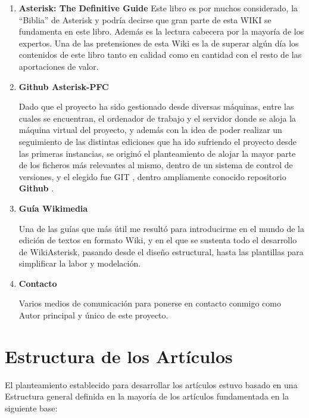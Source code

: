 \begin{enumerate}
	  \setlength{\itemsep}{10pt}

	\item \textbf{Asterisk: The Definitive Guide}
	Este libro es por muchos considerado, la ``Biblia'' de Asterisk y podría decirse que gran parte de esta WIKI se fundamenta en este libro. Además es la lectura cabecera por la mayoría de los expertos. Una de las pretensiones de esta Wiki es la de superar algún día los contenidos de este libro tanto en calidad como en cantidad con el resto de las aportaciones de valor.
	
	\item \textbf{Github Asterisk-PFC}
	
	Dado que el proyecto ha sido gestionado desde diversas máquinas, entre las cuales se encuentran, el ordenador de trabajo y el servidor donde se aloja la máquina virtual del proyecto, y además con la idea de poder realizar un seguimiento de las distintas ediciones que ha ido sufriendo el proyecto desde las primeras instancias, se originó el planteamiento de alojar la mayor parte de los ficheros más relevantes al mismo, dentro de un sistema de control de versiones, y el elegido fue GIT \cite{website:git}, dentro ampliamente conocido repositorio \textbf{Github} \cite{website:github}.
	
	\item \textbf{Guía Wikimedia}
	
	Una de las guías que más útil me resultó para introducirme en el mundo de la edición de textos en formato Wiki, y en el que se sustenta todo el desarrollo de WikiAsterisk, pasando desde el diseño estructural, hasta las plantillas para simplificar la labor y modelación.
	
	\item \textbf{Contacto}
	
	Varios medios de comunicación para ponerse en contacto conmigo como Autor principal y único de este proyecto.
	
\end{enumerate}


\section{Estructura de los Artículos}

El planteamiento establecido para desarrollar los artículos estuvo basado en una Estructura general definida en la mayoría de los artículos fundamentada en la siguiente base:

